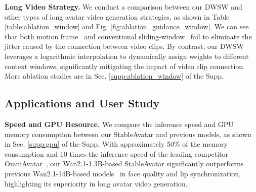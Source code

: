 \begin{table}[t!]\small
\caption{Ablation study on long avatar video generation methods.
}
\vspace{-0.25in}
\begin{center}
\renewcommand\arraystretch{1.1}
\end{center}
\label{table:ablation_window}
\vspace{-0.3in}
\end{table}

\noindent\textbf{Long Video Strategy.}
We conduct a comparison between our DWSW and other types of long avatar video generation strategies, as shown in Table \ref{table:ablation_window} and Fig. \ref{fig:ablation_guidance_window}.
We can see that both motion frame~\cite{cui2025hallo3, kong2025let} and conventional sliding-window~\cite{ji2025sonic} fail to eliminate the jitter caused by the connection between video clips. By contrast, our DWSW leverages a logarithmic interpolation to dynamically assign weights to different context windows, significantly mitigating the impact of video clip connection. More ablation studies are in Sec. \ref{supp:ablation_window} of the Supp.

\subsection{Applications and User Study}
\noindent\textbf{Speed and GPU Resource.}
We compare the inference speed and GPU memory consumption between our StableAvatar and previous models, as shown in Sec. \ref{supp:gpu} of the Supp.
With approximately 50\% of the memory consumption and 10 times the inference speed of the leading competitor OmniAvatar~\cite{gan2025omniavatar}, our Wan2.1-1.3B-based StableAvatar significantly outperforms previous Wan2.1-14B-based models~\cite{wang2025fantasytalking,kong2025let,gan2025omniavatar} in face quality and lip synchronization, highlighting its superiority in long avatar video generation.

